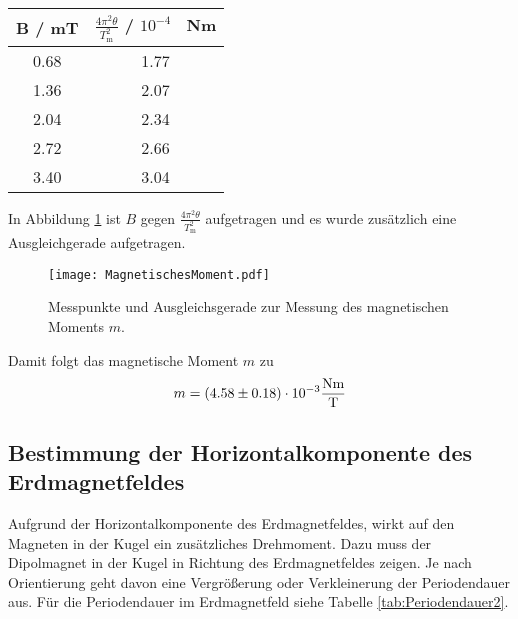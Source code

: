 \begin{table}[H]
  \centering
  \begin{tabular}{c c}
    \toprule
    B / mT & $\frac{4 \pi^2 \theta}{T_\text{m}^2}$ / $10^{-4}$ \ Nm \\
    \midrule
    0.68 & 1.77 \\
    1.36 & 2.07 \\
    2.04 & 2.34 \\
    2.72 & 2.66 \\
    3.40 & 3.04 \\
    \bottomrule
  \end{tabular}
  \caption{}
  \label{tab:BUndMehr}
\end{table}

In Abbildung \ref{fig:magMoment} ist $B$ gegen $\frac{4 \pi^2 \theta}{T_\text{m}^2}$ aufgetragen und es wurde zusätzlich eine Ausgleichgerade aufgetragen.

\begin{figure}[H]
  \centering
  \texttt{[image: MagnetischesMoment.pdf]}
  \caption{Messpunkte und Ausgleichsgerade zur Messung des magnetischen Moments $m$.}
  \label{fig:magMoment}
\end{figure}

Damit folgt das magnetische Moment $m$ zu
\begin{equation}
  m = (\num{4.58 +- 0.18}) \cdot 10^{-3} \frac{\text{Nm}}{\text{T}}
\end{equation}


\subsection{Bestimmung der Horizontalkomponente des Erdmagnetfeldes}
Aufgrund der Horizontalkomponente des Erdmagnetfeldes, wirkt auf den Magneten in der Kugel ein zusätzliches Drehmoment. Dazu muss der Dipolmagnet in der Kugel in Richtung des Erdmagnetfeldes zeigen. Je nach Orientierung geht davon eine Vergrößerung oder Verkleinerung der Periodendauer aus. Für die Periodendauer im Erdmagnetfeld siehe Tabelle \ref{tab:Periodendauer2}.


